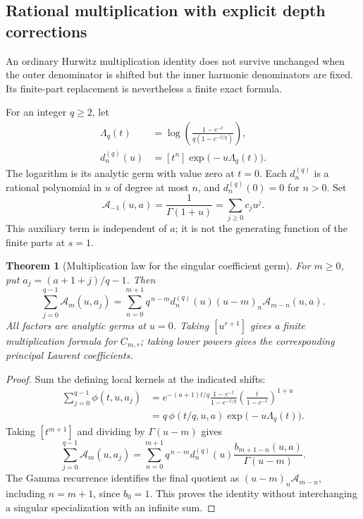 \documentclass[11pt,letterpaper]{article}
\numberwithin{equation}{section}
\theoremstyle{plain}
\newtheorem{theorem}{Theorem}[section]
\theoremstyle{definition}
\theoremstyle{remark}
\begin{document}
\subsection{Rational multiplication with explicit depth corrections}
\label{harm:subsec:multiplication}

An ordinary Hurwitz multiplication identity does not survive unchanged
when the outer denominator is shifted but the inner harmonic
denominators are fixed. Its finite-part replacement is nevertheless a
finite exact formula.

For an integer \(q\geq2\), let
\begin{equation}\label{harm:eq:dq}
 \begin{split}
 \Lambda_q(t)&=\log\left(
       \frac{1-e^{-t}}{q(1-e^{-t/q})}\right),\\
 d_n^{(q)}(u)&=[t^n]\exp\bigl(-u\Lambda_q(t)\bigr).
 \end{split}
\end{equation}
The logarithm is its analytic germ with value zero at \(t=0\).
Each \(d_n^{(q)}\) is a rational polynomial in \(u\) of degree at most
\(n\), and \(d_n^{(q)}(0)=0\) for \(n>0\). Set
\[
 \mathcal A_{-1}(u,a)=\frac{1}{\Gamma(1+u)}
                    =\sum_{j\geq0}c_j u^j.
\]
This auxiliary term is independent of \(a\); it is not the generating
function of the finite parts at \(s=1\).

\begin{theorem}[Multiplication law for the singular coefficient germ]
\label{harm:thm:multiplication}
For \(m\geq0\), put \(a_j=(a+1+j)/q-1\). Then
\begin{equation}\label{harm:eq:multiplication}
 \sum_{j=0}^{q-1}\mathcal A_m(u,a_j)
 =\sum_{n=0}^{m+1}
       q^{\,n-m}d_n^{(q)}(u)(u-m)_n
                     \mathcal A_{m-n}(u,a).
\end{equation}
All factors are analytic germs at \(u=0\). Taking \([u^{r+1}]\)
gives a finite multiplication formula for \(C_{m,r}\); taking lower
powers gives the corresponding principal Laurent coefficients.
\end{theorem}

\begin{proof}
Sum the defining local kernels at the indicated shifts:
\[
 \begin{split}
 \sum_{j=0}^{q-1}\phi(t,u,a_j)
 &=e^{-(a+1)t/q}
       \frac{1-e^{-t}}{1-e^{-t/q}}
       \left(\frac{t}{1-e^{-t}}\right)^{1+u}\\
 &=q\,\phi(t/q,u,a)\exp\bigl(-u\Lambda_q(t)\bigr).
 \end{split}
\]
Taking \([t^{m+1}]\) and dividing by \(\Gamma(u-m)\) gives
\[
 \sum_{j=0}^{q-1}\mathcal A_m(u,a_j)
 =\sum_{n=0}^{m+1}q^{\,n-m}d_n^{(q)}(u)
       \frac{b_{m+1-n}(u,a)}{\Gamma(u-m)}.
\]
The Gamma recurrence identifies the final quotient as
\((u-m)_n\mathcal A_{m-n}\), including \(n=m+1\), since
\(b_0=1\). This proves the identity without interchanging a
singular specialization with an infinite sum.
\end{proof}
\end{document}
